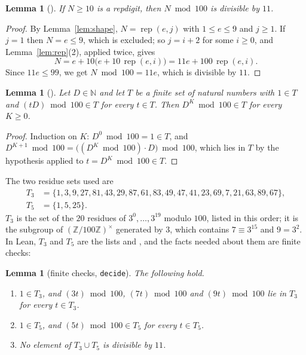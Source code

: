 \documentclass[11pt]{amsart}
\theoremstyle{plain}
\newtheorem{lemma}[theorem]{Lemma}
\theoremstyle{definition}
\newcommand{\N}{\mathbb{N}}
\newcommand{\rep}{\operatorname{rep}}
\begin{document}
\begin{lemma}[]\label{lem:100}
If $N\ge10$ is a repdigit, then $N\bmod 100$ is divisible by $11$.
\end{lemma}

\begin{proof}
By Lemma~\ref{lem:shape}, $N=\rep(e,j)$ with $1\le e\le9$ and $j\ge1$. If $j=1$ then $N=e\le9$, which is excluded; so $j=i+2$ for some $i\ge0$, and Lemma~\ref{lem:rep}(2), applied twice, gives
\[
  N=e+10\bigl(e+10\,\rep(e,i)\bigr)=11e+100\,\rep(e,i).
\]
Since $11e\le99$, we get $N\bmod100=11e$, which is divisible by $11$.
\end{proof}

\begin{lemma}[]\label{lem:orbit}
Let $D\in\N$ and let $T$ be a finite set of natural numbers with $1\in T$ and $(tD)\bmod100\in T$ for every $t\in T$. Then $D^K\bmod 100\in T$ for every $K\ge0$.
\end{lemma}

\begin{proof}
Induction on $K$: $D^0\bmod100=1\in T$, and $D^{K+1}\bmod100=\bigl((D^K\bmod100)\cdot D\bigr)\bmod100$, which lies in $T$ by the hypothesis applied to $t=D^K\bmod100\in T$.
\end{proof}

The two residue sets used are
\begin{align*}
T_3&=\{1,3,9,27,81,43,29,87,61,83,49,47,41,23,69,7,21,63,89,67\},\\
T_5&=\{1,5,25\}.
\end{align*}
$T_3$ is the set of the $20$ residues of $3^0,\dots,3^{19}$ modulo $100$, listed in this order; it is the subgroup of $(\mathbb{Z}/100\mathbb{Z})^\times$ generated by $3$, which contains $7\equiv3^{15}$ and $9=3^2$. In Lean, $T_3$ and $T_5$ are the lists  and , and the facts needed about them are finite checks:

\begin{lemma}[finite checks, \texttt{decide}]\label{lem:tables}
The following hold.
\begin{enumerate}
\item $1\in T_3$, and $(3t)\bmod100$, $(7t)\bmod100$ and $(9t)\bmod100$ lie in $T_3$ for every $t\in T_3$.
\item $1\in T_5$, and $(5t)\bmod100\in T_5$ for every $t\in T_5$.
\item No element of $T_3\cup T_5$ is divisible by $11$.
\end{enumerate}
\end{lemma}
\end{document}
